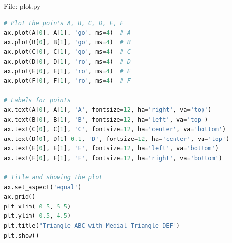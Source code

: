 \documentclass{beamer}
\numberwithin{equation}{section}
\theoremstyle{remark}
\begin{document}
\begin{frame}[fragile]{File: plot.py}
\begin{lstlisting}[language=Python]
# Plot the points A, B, C, D, E, F
ax.plot(A[0], A[1], 'go', ms=4)  # A
ax.plot(B[0], B[1], 'go', ms=4)  # B
ax.plot(C[0], C[1], 'go', ms=4)  # C
ax.plot(D[0], D[1], 'ro', ms=4)  # D
ax.plot(E[0], E[1], 'ro', ms=4)  # E
ax.plot(F[0], F[1], 'ro', ms=4)  # F

# Labels for points
ax.text(A[0], A[1], 'A', fontsize=12, ha='right', va='top')
ax.text(B[0], B[1], 'B', fontsize=12, ha='left', va='top')
ax.text(C[0], C[1], 'C', fontsize=12, ha='center', va='bottom')
ax.text(D[0], D[1]-0.1, 'D', fontsize=12, ha='center', va='top')
ax.text(E[0], E[1], 'E', fontsize=12, ha='left', va='bottom')
ax.text(F[0], F[1], 'F', fontsize=12, ha='right', va='bottom')

# Title and showing the plot
ax.set_aspect('equal')
ax.grid()
plt.xlim(-0.5, 5.5)
plt.ylim(-0.5, 4.5)
plt.title("Triangle ABC with Medial Triangle DEF")
plt.show()
\end{lstlisting}
\end{frame}
\end{document}
